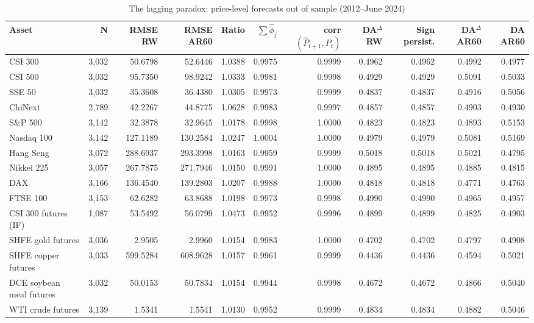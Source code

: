 \begin{table}[!htbp]\centering\scriptsize
\caption{The lagging paradox: price-level forecasts out of sample (2012--June 2024)}\label{tab:lagging}
\begin{adjustbox}{max width=\textwidth}
\begin{tabular}{lrrrrrrrrrr}
\toprule
Asset & N & RMSE RW & RMSE AR60 & Ratio & $\sum\hat\phi_j$ & corr$(\hat P_{t+1},P_t)$ & DA$^{\Delta}$ RW & Sign persist. & DA$^{\Delta}$ AR60 & DA AR60\\
\midrule
CSI 300 & 3,032 & 50.6798 & 52.6446 & 1.0388 & 0.9975 & 0.9999 & 0.4962 & 0.4962 & 0.4992 & 0.4977\\
CSI 500 & 3,032 & 95.7350 & 98.9242 & 1.0333 & 0.9981 & 0.9998 & 0.4929 & 0.4929 & 0.5091 & 0.5033\\
SSE 50 & 3,032 & 35.3608 & 36.4380 & 1.0305 & 0.9973 & 0.9999 & 0.4837 & 0.4837 & 0.4916 & 0.5056\\
ChiNext & 2,789 & 42.2267 & 44.8775 & 1.0628 & 0.9983 & 0.9997 & 0.4857 & 0.4857 & 0.4903 & 0.4930\\
S\&P 500 & 3,142 & 32.3878 & 32.9645 & 1.0178 & 0.9998 & 1.0000 & 0.4823 & 0.4823 & 0.4893 & 0.5153\\
Nasdaq 100 & 3,142 & 127.1189 & 130.2584 & 1.0247 & 1.0004 & 1.0000 & 0.4979 & 0.4979 & 0.5081 & 0.5169\\
Hang Seng & 3,072 & 288.6937 & 293.3998 & 1.0163 & 0.9959 & 0.9999 & 0.5018 & 0.5018 & 0.5021 & 0.4795\\
Nikkei 225 & 3,057 & 267.7875 & 271.7946 & 1.0150 & 0.9991 & 1.0000 & 0.4895 & 0.4895 & 0.4885 & 0.4815\\
DAX & 3,166 & 136.4540 & 139.2803 & 1.0207 & 0.9988 & 1.0000 & 0.4818 & 0.4818 & 0.4771 & 0.4763\\
FTSE 100 & 3,153 & 62.6282 & 63.8688 & 1.0198 & 0.9973 & 0.9998 & 0.4990 & 0.4990 & 0.4965 & 0.4957\\
CSI 300 futures (IF) & 1,087 & 53.5492 & 56.0799 & 1.0473 & 0.9952 & 0.9996 & 0.4899 & 0.4899 & 0.4825 & 0.4903\\
SHFE gold futures & 3,036 & 2.9505 & 2.9960 & 1.0154 & 0.9983 & 1.0000 & 0.4702 & 0.4702 & 0.4797 & 0.4908\\
SHFE copper futures & 3,033 & 599.5284 & 608.9628 & 1.0157 & 0.9961 & 0.9999 & 0.4436 & 0.4436 & 0.4594 & 0.5021\\
DCE soybean meal futures & 3,032 & 50.0153 & 50.7834 & 1.0154 & 0.9944 & 0.9998 & 0.4672 & 0.4672 & 0.4866 & 0.5040\\
WTI crude futures & 3,139 & 1.5341 & 1.5541 & 1.0130 & 0.9952 & 0.9999 & 0.4834 & 0.4834 & 0.4882 & 0.5046\\

\end{tabular}
\end{adjustbox}
\end{table}
